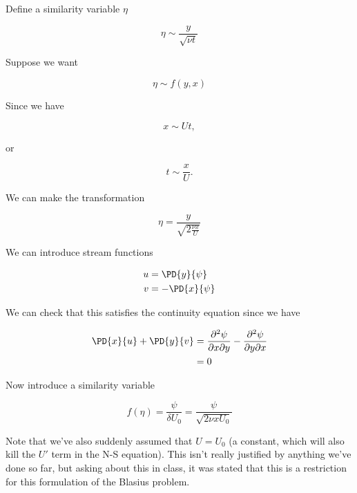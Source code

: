 Define a similarity variable $\eta$ 

\begin{equation}\label{eqn:continuumL19:230}
\eta \sim \frac{y}{\sqrt{\nu t}}
\end{equation}

Suppose we want

\begin{equation}\label{eqn:continuumL19:250}
\eta \sim f(y, x)
\end{equation}

Since we have

\begin{equation}\label{eqn:continuumL19:270}
x \sim U t,
\end{equation}

or

\begin{equation}\label{eqn:continuumL19:290}
t \sim \frac{x}{U}.
\end{equation}

We can make the transformation

\begin{equation}\label{eqn:continuumL19:310}
\eta = \frac{y}{\sqrt{2 \frac{\nu x}{U}}}
\end{equation}

We can introduce stream functions

\begin{align}\label{eqn:continuumProblemSet2:330}
u &= \PD{y}{\psi} \\
v &= -\PD{x}{\psi}
\end{align}

We can check that this satisfies the continuity equation since we have

\begin{align*}
\PD{x}{u} + \PD{y}{v} 
&=
\frac{\partial^2 \psi}{\partial x \partial y}
-\frac{\partial^2 \psi}{\partial y \partial x} \\
&= 0
\end{align*}

Now introduce a similarity variable 

\begin{equation}\label{eqn:continuumL19:350}
f(\eta) = \frac{\psi}{\delta U_0} = \frac{\psi}{\sqrt{2 \nu x U_0}}
\end{equation}

Note that we've also suddenly assumed that $U = U_0$ (a constant, which will also kill the $U'$ term in the N-S equation).  This isn't really justified by anything we've done so far, but asking about this in class, it was stated that this is a restriction for this formulation of the Blasius problem.

